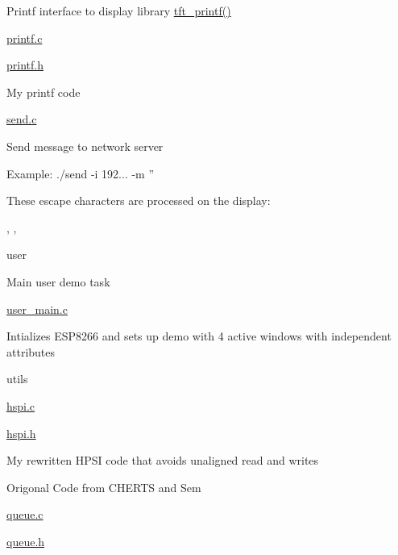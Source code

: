 \begin{DoxyItemize}
\begin{DoxyItemize}
\begin{DoxyItemize}
\begin{DoxyItemize}
\item Printf interface to display library \hyperlink{tft__printf_8c_ad6d6dda4facdc045d477c0cc9403e0c1}{tft\-\_\-printf()}
\end{DoxyItemize}
\item \hyperlink{printf_8c}{printf.\-c}
\item \hyperlink{printf_8h}{printf.\-h}
\begin{DoxyItemize}
\item My printf code
\end{DoxyItemize}
\end{DoxyItemize}
\end{DoxyItemize}
\item \hyperlink{send_8c}{send.\-c}
\begin{DoxyItemize}
\item Send message to network server
\item Example\-: ./send -\/i 192... -\/m ''
\begin{DoxyItemize}
\item These escape characters are processed on the display\-: \par
, , 
\end{DoxyItemize}
\end{DoxyItemize}
\item user
\begin{DoxyItemize}
\item Main user demo task
\item \hyperlink{user__main_8c}{user\-\_\-main.\-c}
\begin{DoxyItemize}
\item Intializes E\-S\-P8266 and sets up demo with 4 active windows with independent attributes
\end{DoxyItemize}
\end{DoxyItemize}
\item utils
\begin{DoxyItemize}
\item \hyperlink{hspi_8c}{hspi.\-c}
\item \hyperlink{hspi_8h}{hspi.\-h}
\begin{DoxyItemize}
\item My rewritten H\-P\-S\-I code that avoids unaligned read and writes
\item Origonal Code from C\-H\-E\-R\-T\-S and Sem
\end{DoxyItemize}
\item \hyperlink{queue_8c}{queue.\-c}
\item \hyperlink{queue_8h}{queue.\-h}

\end{DoxyItemize}
\end{DoxyItemize}
